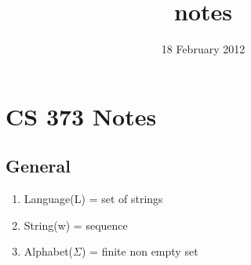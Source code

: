 \documentclass[11pt]{article}
\title{notes}
\author{}
\date{18 February 2012}
\begin{document}
\maketitle

\setcounter{tocdepth}{3}
\tableofcontents
\vspace*{1cm}
\section{CS 373 Notes}
\label{sec-1}

\subsection{General}
\label{sec-1.1}

\begin{enumerate}
\item Language(L) = set of strings
\item String(w) = sequence
\item Alphabet($\Sigma$) = finite non empty set
\end{enumerate}
\subsection{}

  
\end{document}
